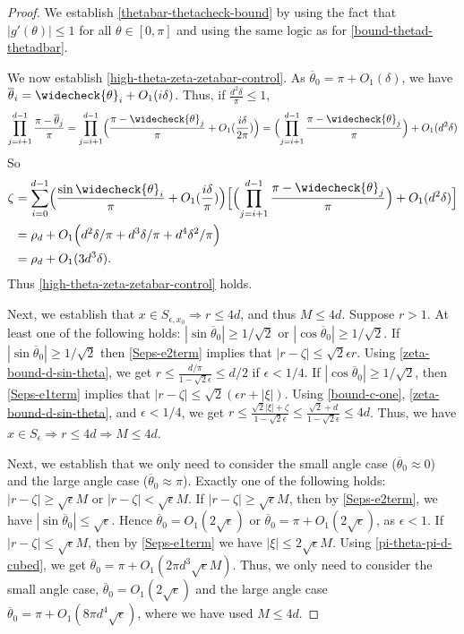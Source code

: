 \documentclass[11pt]{article}
\newcommand{\eps}{\epsilon}
\newcommand{\thetabar}{\overline{\theta}}
\newcommand{\thetacheck}{\widecheck{\theta}}
\newcommand{\zetacheck}{\rho}
\newcommand{\xo}{x_0}
\newcommand{\Sepsxo}{S_{\eps, \xo}}
\begin{document}
\begin{proof}
We establish \eqref{thetabar-thetacheck-bound} by using the fact that $|g'(\theta)| \leq 1$ for all $\theta \in [0, \pi]$ and using the same logic as for \eqref{bound-thetad-thetadbar}.

We now establish \eqref{high-theta-zeta-zetabar-control}.  As $\thetabar_0 = \pi + O_1(\delta)$, we have $\thetabar_i = \thetacheck_i + O_1(i \delta)$.  Thus, if $\frac{d^2 \delta}{\pi}\leq 1$,
\[
\prod_{j=i+1}^{d-1} \frac{\pi - \thetabar_j}{\pi} = \prod_{j=i+1}^{d-1} \Bigl( \frac{\pi - \thetacheck_j}{\pi} + O_1(\frac{i \delta}{2 \pi} ) \Bigr) = \Bigl(\prod_{j=i+1}^{d-1}  \frac{\pi - \thetacheck_j}{\pi} \Bigr)  + O_1(d^2 \delta )
\]
So
\begin{align}
\zeta &= \sum_{i=0}^{d-1} \Bigl( \frac{\sin \thetacheck_i}{\pi} + O_1(\frac{i \delta}{\pi}) \Bigr)  \Bigl[ \Bigl(\prod_{j=i+1}^{d-1} \frac{\pi - \thetacheck_j}{\pi} \Bigr) +O_1(d^2 \delta)  \Bigr] \\
&= \zetacheck_d + O_1 \Bigl( d^2\delta / \pi + d^3 \delta /\pi + d^4 \delta^2/\pi   \Bigr) \\
&= \zetacheck_d + O_1( 3 d^3 \delta).
\end{align}
Thus \eqref{high-theta-zeta-zetabar-control} holds.

Next, we establish that $x \in \Sepsxo \Rightarrow r \leq 4d$, and thus $M \leq 4d$.  Suppose $r > 1$.  At least one of the following holds: $|\sin\thetabar_0| \geq 1/\sqrt{2}$ or $|\cos \thetabar_0| \geq 1/\sqrt{2}$. If $|\sin \thetabar_0| \geq 1/\sqrt{2}$ then  \eqref{Seps-e2term} implies that $|r - \zeta| \leq \sqrt{2} \eps r$.  Using \eqref{zeta-bound-d-sin-theta}, we get $ r \leq \frac{d/\pi}{1 - \sqrt{2} \eps} \leq d/2$ if $\eps < 1/4$.  If $| \cos \thetabar_0| \geq 1/\sqrt{2}$, then \eqref{Seps-e1term} implies that 
$|r - \zeta| \leq \sqrt{2} (\eps r + |\xi|)$.   Using \eqref{bound-c-one}, \eqref{zeta-bound-d-sin-theta}, and $\eps<1/4$, we get $r \leq \frac{\sqrt{2} |\xi| +  \zeta}{1 - \sqrt{2}{\eps}} \leq \frac{\sqrt{2} + d }{1 - \sqrt{2} \eps} \leq 4 d$. Thus, we have $x \in S_\eps \Rightarrow r \leq 4d \Rightarrow M \leq 4d$. 

Next, we establish that we only need to consider the small angle case ($\thetabar_0 \approx 0$) and the large angle case ($\thetabar_0 \approx \pi$).  Exactly one of the following holds: $|r - \zeta| \geq \sqrt{\eps} M$ or $|r -\zeta| < \sqrt{\eps} M$.    If $|r - \zeta| \geq \sqrt{\eps}M$, then by \eqref{Seps-e2term}, we have $|\sin\thetabar_0| \leq \sqrt{\eps}$.  Hence $\thetabar_0 = O_1(2 \sqrt{\eps})$ or $\thetabar_0 = \pi + O_1(2 \sqrt{\eps})$, as $\eps < 1$. If $|r - \zeta| \leq \sqrt{\eps} M$, then by \eqref{Seps-e1term} we have $|\xi| \leq 2 \sqrt{\eps} M$.  Using \eqref{pi-theta-pi-d-cubed}, we get $\thetabar_0 = \pi + O_1(2 \pi d^3 \sqrt{\eps} M)$.  Thus, we only need to consider the small angle case, $\thetabar_0 =O_1(2 \sqrt{\eps})$ and the large angle case $\thetabar_0 = \pi + O_1(8 \pi d^4 \sqrt{\eps})$, where we have used $M \leq 4 d$.


\end{proof}
\end{document}
